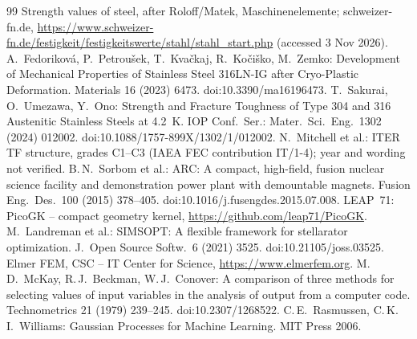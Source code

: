 \documentclass[10pt,a4paper]{article}
\begin{document}
\begin{thebibliography}{99}\small
{} Strength values of steel, after Roloff/Matek, Maschinenelemente; schweizer-fn.de,
  \url{https://www.schweizer-fn.de/festigkeit/festigkeitswerte/stahl/stahl_start.php} (accessed 3 Nov 2026).
 A.~Fedoriková, P.~Petroušek, T.~Kvačkaj, R.~Kočiško, M.~Zemko: Development of Mechanical
  Properties of Stainless Steel 316LN-IG after Cryo-Plastic Deformation. Materials 16 (2023) 6473.
  doi:10.3390/ma16196473.
 T.~Sakurai, O.~Umezawa, Y.~Ono: Strength and Fracture Toughness of Type 304 and 316 Austenitic
  Stainless Steels at 4.2~K. IOP Conf.\ Ser.: Mater.\ Sci.\ Eng.\ 1302 (2024) 012002.
  doi:10.1088/1757-899X/1302/1/012002.
 N.~Mitchell et al.: ITER TF structure, grades C1--C3 (IAEA FEC contribution IT/1-4); year and wording not verified.
 B.\,N.~Sorbom et al.: ARC: A compact, high-field, fusion nuclear science facility and demonstration
  power plant with demountable magnets. Fusion Eng.\ Des.\ 100 (2015) 378--405. doi:10.1016/j.fusengdes.2015.07.008.
 LEAP~71: PicoGK -- compact geometry kernel, \url{https://github.com/leap71/PicoGK}.
 M.~Landreman et al.: SIMSOPT: A flexible framework for stellarator optimization. J.\ Open Source
  Softw.\ 6 (2021) 3525. doi:10.21105/joss.03525.
 Elmer FEM, CSC -- IT Center for Science, \url{https://www.elmerfem.org}.
 M.\,D.~McKay, R.\,J.~Beckman, W.\,J.~Conover: A comparison of three methods for selecting values
  of input variables in the analysis of output from a computer code. Technometrics 21 (1979) 239--245.
  doi:10.2307/1268522.
 C.\,E.~Rasmussen, C.\,K.\,I.~Williams: Gaussian Processes for Machine Learning. MIT Press 2006.
\end{thebibliography}
\end{document}
